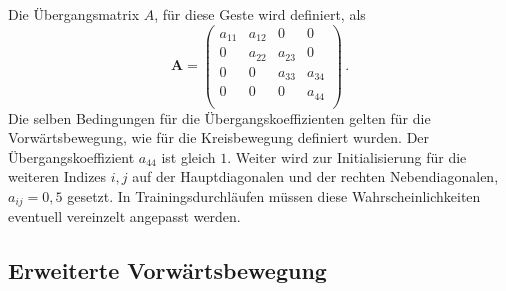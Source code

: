 Die \"Ubergangsmatrix $A$, f\"ur diese Geste wird definiert, als
\begin{equation}
\mathbf{A} = 
\begin{pmatrix}
a_{11} & a_{12} & 0 & 0\\
0 & a_{22} & a_{23} & 0 \\
0 & 0 & a_{33} & a_{34}\\
0 & 0 & 0 & a_{44} \\
\end{pmatrix} \, .
\end{equation}
Die selben Bedingungen f\"ur die \"Ubergangskoeffizienten gelten f\"ur die Vorw\"artsbewegung, wie f\"ur die Kreisbewegung definiert wurden. 
\newline
Der \"Ubergangskoeffizient $a_{44}$ ist gleich $1$. Weiter wird zur Initialisierung f\"ur die weiteren Indizes $i, j$ auf der Hauptdiagonalen und der rechten Nebendiagonalen, $a_{ij} = 0,5$ gesetzt. In Trainingsdurchl\"aufen m\"ussen diese Wahrscheinlichkeiten eventuell vereinzelt angepasst werden.

\subsection{Erweiterte Vorw\"artsbewegung}
\label{subsec:gesture-extforward}

